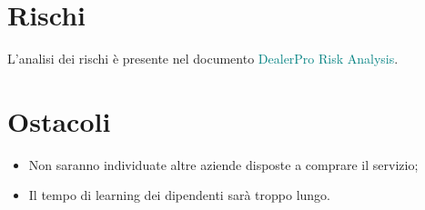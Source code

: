 \documentclass{article}
\begin{document}
  \section*{Rischi}
  L'analisi dei rischi è presente nel documento \textcolor{teal}{DealerPro Risk Analysis}.

  \section*{Ostacoli}
  \begin{itemize}
    \item Non saranno individuate altre aziende disposte a comprare il servizio;
    \item Il tempo di learning dei dipendenti sarà troppo lungo.
  \end{itemize}

 
\end{document}
